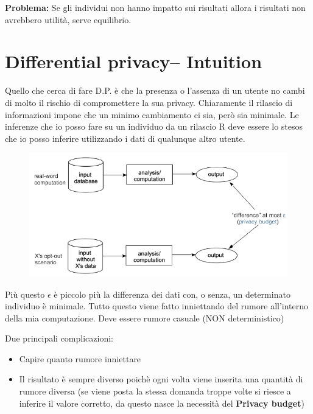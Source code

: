 \documentclass{report}
\begin{document}
\noindent \textbf{Problema:} Se gli individui non hanno impatto sui risultati allora i risultati non avrebbero utilità, serve equilibrio.

\section{Differential privacy– Intuition}
Quello che cerca di fare D.P. è che la presenza o l'assenza di un utente no cambi di molto il rischio di compromettere la sua privacy.
Chiaramente il rilascio di informazioni impone che un minimo cambiamento ci sia, però sia minimale.
Le inferenze che io posso fare su un individuo da un rilascio R deve essere lo stesos che io posso inferire utilizzando i dati di qualunque altro utente.
\begin{figure}[H]
        \centering
        \includegraphics[width=0.6\linewidth]{images/intuition.png}
    \end{figure}

\noindent Più questo $\epsilon$ è piccolo più la differenza dei dati con, o senza, un determinato individuo è minimale.
Tutto questo viene fatto inniettando del rumore all'interno della mia computazione. Deve essere rumore casuale (NON deterministico)

\noindent Due principali complicazioni:
\begin{itemize}
    \item Capire quanto rumore inniettare
    \item Il risultato è sempre diverso poichè ogni volta viene inserita una quantità di rumore diversa (se viene posta la stessa domanda troppe volte si riesce a inferire il valore corretto, da questo nasce
    la necessità del \textbf{Privacy budget})
\end{itemize}
\end{document}

